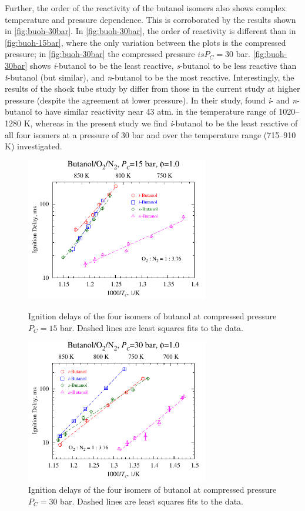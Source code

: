 \documentclass[12pt, letterpaper]{article}
\begin{document}
Further, the order of the reactivity of the butanol isomers also shows complex
temperature and pressure dependence. This is corroborated by the results shown
in \autoref{fig:buoh-30bar}. In \autoref{fig:buoh-30bar}, the order of
reactivity is different than in \autoref{fig:buoh-15bar}, where the only
variation between the plots is the compressed pressure; in
\autoref{fig:buoh-30bar} the compressed pressure $is P_C=30$ bar.
\autoref{fig:buoh-30bar} shows \textit{i}-butanol to be the least reactive,
\textit{s}-butanol to be less reactive than \textit{t}-butanol (but similar),
and \textit{n}-butanol to be the most reactive. Interestingly, the results of
the shock tube study by \textcite{Stranic2012} differ from those in the current
study at higher pressure (despite the agreement at lower pressure). In their
study, \textcite{Stranic2012} found \textit{i}- and \textit{n}-butanol to have
similar reactivity near 43 atm. in the temperature range of 1020–1280 K,
whereas in the present study we find \textit{i}-butanol to be the least
reactive of all four isomers at a pressure of 30 bar and over the temperature
range (715–910 K) investigated.

\begin{figure}
    \centering
    \begin{minipage}{0.45\textwidth}
        \includegraphics[width=8cm]{03-Butanol/buoh-15bar}
        \caption{Ignition delays of the four isomers of butanol at compressed 
            pressure $P_C=15$ bar. Dashed lines are least squares fits to the
            data.}
        \label{fig:buoh-15bar}
    \end{minipage}
    \quad
    \begin{minipage}{0.45\textwidth}
        \includegraphics[width=8cm]{03-Butanol/buoh-30bar}
        \caption{Ignition delays of the four isomers of butanol at compressed 
            pressure $P_C=30$ bar. Dashed lines are least squares fits to the
            data.}
        \label{fig:buoh-30bar}
    \end{minipage}
\end{figure}
\end{document}

